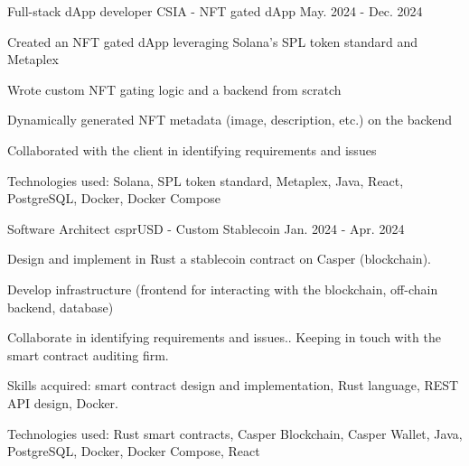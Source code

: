 \begin{cventries}
  \cventry
    {Full-stack dApp developer} %
    {CSIA - NFT gated dApp} %
    {} %
    {May. 2024 - Dec. 2024} %
    {
      \begin{cvitems} %
        \item {Created an NFT gated dApp leveraging Solana's SPL token standard and Metaplex}
        \item {Wrote custom NFT gating logic and a backend from scratch}
        \item {Dynamically generated NFT metadata (image, description, etc.) on the backend}
        \item {Collaborated with the client in identifying requirements and issues}
        \item {Technologies used: Solana, SPL token standard, Metaplex, Java, React, PostgreSQL, Docker, Docker Compose}
      \end{cvitems}
    }

  \cventry
    {Software Architect} %
    {csprUSD - Custom Stablecoin} %
    {} %
    {Jan. 2024 - Apr. 2024} %
    {
      \begin{cvitems} %
        \item {Design and implement in Rust a stablecoin contract on Casper (blockchain).}
        \item {Develop infrastructure (frontend for interacting with the blockchain, off-chain backend, database)}
        \item {Collaborate in identifying requirements and issues.. Keeping in touch with the smart contract auditing firm.}
        \item {Skills acquired: smart contract design and implementation, Rust language, REST API design, Docker.}
        \item {Technologies used: Rust smart contracts, Casper Blockchain, Casper Wallet, Java, PostgreSQL, Docker, Docker Compose, React}
      \end{cvitems}
    }


\end{cventries}
